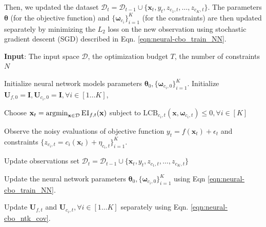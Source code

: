 Then, we updated the dataset $\mathcal{D}_t = \mathcal{D}_{t-1} \cup \{\mathbf{x}_t, y_t, z_{c_1,t}, \dots, z_{{c_K}, t}\}$. The parameters $\boldsymbol{\theta}$ (for the objective function) and $\{ \boldsymbol{\omega}_{c_i} \}_{i=1}^K$ (for the constraints) are then updated separately by minimizing the $L_2$ loss on the new observation using stochastic gradient descent (SGD) described in Eqn. \eqref{eqn:neural-cbo_train_NN}.


\begin{algorithm}[!ht]
\caption{Neural Network based Black-box Optimization with unknown constraints (Neural-CBO)}
\label{alg:neural_cbo}
\textbf{Input}: The input space $\mathcal D$, the optimization budget $T$, the number of constraints $N$
\begin{algorithmic}[1]
\State Initialize neural network models parameters $\boldsymbol{\theta}_0, \{ \boldsymbol{\omega}_{c_i,0} \}_{i=1}^K$.
\State Initialize $\mathbf{U}_{f,0} =   \mathbf{I}, \mathbf{U}_{c_i,0} =   \mathbf{I}, \forall i \in [1 \dots K]$,  

\State \parbox[t]{\dimexpr\linewidth-\algorithmicindent}{%
 Choose $\mathbf{x}_t = \operatorname*{argmin}_{\mathbf{x} \in \mathcal{D}} \textsc{EI}_{f,t}(\mathbf{x}) $ subject to $\text{LCB}_{c_i,t}(\mathbf{x}, \boldsymbol{\omega}_{c_i,t}) \le 0, \forall i \in [K]$ \label{alg:line_lcb_ei}
}
\State \parbox[t]{\dimexpr\linewidth-\algorithmicindent}{%
 Observe the noisy evaluations of objective function $y_t = f(\mathbf{x}_t) + \epsilon_t$ and constraints $\{ z_{c_i,t} = c_i(\mathbf{x}_t) + \eta_{c_i,t} \}_{i=1}^K$.
}
\State \parbox[t]{\dimexpr\linewidth-\algorithmicindent}{%
 Update observations set $\mathcal{D}_t = \mathcal{D}_{t-1} \cup \{\mathbf{x}_t, y_t, z_{c_1,t}, \dots, z_{{c_K}, t}\}$
}
\State \parbox[t]{\dimexpr\linewidth-\algorithmicindent}{%
 Update the neural network parameters $\boldsymbol{\theta}_0, \{ \boldsymbol{\omega}_{c_i,0} \}_{i=1}^K$ using Eqn \eqref{eqn:neural-cbo_train_NN}.
}
\State \parbox[t]{\dimexpr\linewidth-\algorithmicindent}{%
 Update $\mathbf{U}_{f,t}$ and $\mathbf{U}_{c_i,t}, \forall i \in [1 \dots K]$ separately using Eqn. \eqref{eqn:neural-cbo_ntk_cov}.
}
\EndFor

\end{algorithmic}
\end{algorithm}

